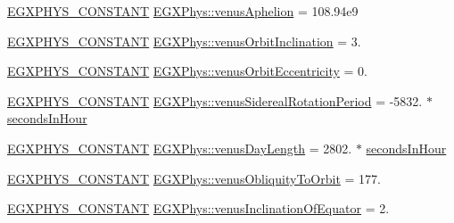 \begin{DoxyCompactItemize}
\item 
\mbox{\hyperlink{group___e_g_x_phys-_constants-_macros_ga76980d288494ce1714c9ac68a95ba702}{E\+G\+X\+P\+H\+Y\+S\+\_\+\+C\+O\+N\+S\+T\+A\+NT}} \mbox{\hyperlink{group___e_g_x_phys-_constants-_astrophysics-_solar_system-_venus-_orbit_ga46a4d6d0283aa74cabd679f51defc2b4}{E\+G\+X\+Phys\+::venus\+Aphelion}} = 108.\+94e9
\item 
\mbox{\hyperlink{group___e_g_x_phys-_constants-_macros_ga76980d288494ce1714c9ac68a95ba702}{E\+G\+X\+P\+H\+Y\+S\+\_\+\+C\+O\+N\+S\+T\+A\+NT}} \mbox{\hyperlink{group___e_g_x_phys-_constants-_astrophysics-_solar_system-_venus-_orbit_ga54de9193ce649348c07a56398161dc6e}{E\+G\+X\+Phys\+::venus\+Orbit\+Inclination}} = 3.
\item 
\mbox{\hyperlink{group___e_g_x_phys-_constants-_macros_ga76980d288494ce1714c9ac68a95ba702}{E\+G\+X\+P\+H\+Y\+S\+\_\+\+C\+O\+N\+S\+T\+A\+NT}} \mbox{\hyperlink{group___e_g_x_phys-_constants-_astrophysics-_solar_system-_venus-_orbit_ga78f2cdfeba6d640c0dceeb7b83c6b238}{E\+G\+X\+Phys\+::venus\+Orbit\+Eccentricity}} = 0.
\item 
\mbox{\hyperlink{group___e_g_x_phys-_constants-_macros_ga76980d288494ce1714c9ac68a95ba702}{E\+G\+X\+P\+H\+Y\+S\+\_\+\+C\+O\+N\+S\+T\+A\+NT}} \mbox{\hyperlink{group___e_g_x_phys-_constants-_astrophysics-_solar_system-_venus-_orbit_ga4e94bf7176747a4bcb1c29f3fcb0aa04}{E\+G\+X\+Phys\+::venus\+Sidereal\+Rotation\+Period}} = -\/5832. $\ast$ \mbox{\hyperlink{namespace_e_g_x_phys_a7c3165cd93e36f1fb8e9fef80f117bef}{seconds\+In\+Hour}}
\item 
\mbox{\hyperlink{group___e_g_x_phys-_constants-_macros_ga76980d288494ce1714c9ac68a95ba702}{E\+G\+X\+P\+H\+Y\+S\+\_\+\+C\+O\+N\+S\+T\+A\+NT}} \mbox{\hyperlink{group___e_g_x_phys-_constants-_astrophysics-_solar_system-_venus-_orbit_ga735cf10c3a3d188f1979b5bc721ec953}{E\+G\+X\+Phys\+::venus\+Day\+Length}} = 2802. $\ast$ \mbox{\hyperlink{namespace_e_g_x_phys_a7c3165cd93e36f1fb8e9fef80f117bef}{seconds\+In\+Hour}}
\item 
\mbox{\hyperlink{group___e_g_x_phys-_constants-_macros_ga76980d288494ce1714c9ac68a95ba702}{E\+G\+X\+P\+H\+Y\+S\+\_\+\+C\+O\+N\+S\+T\+A\+NT}} \mbox{\hyperlink{group___e_g_x_phys-_constants-_astrophysics-_solar_system-_venus-_orbit_ga6ece4191c84ea60e64f195d42e99e71c}{E\+G\+X\+Phys\+::venus\+Obliquity\+To\+Orbit}} = 177.
\item 
\mbox{\hyperlink{group___e_g_x_phys-_constants-_macros_ga76980d288494ce1714c9ac68a95ba702}{E\+G\+X\+P\+H\+Y\+S\+\_\+\+C\+O\+N\+S\+T\+A\+NT}} \mbox{\hyperlink{group___e_g_x_phys-_constants-_astrophysics-_solar_system-_venus-_orbit_ga53a16fb99d0559c47885d1b410c32401}{E\+G\+X\+Phys\+::venus\+Inclination\+Of\+Equator}} = 2.
\end{DoxyCompactItemize}


